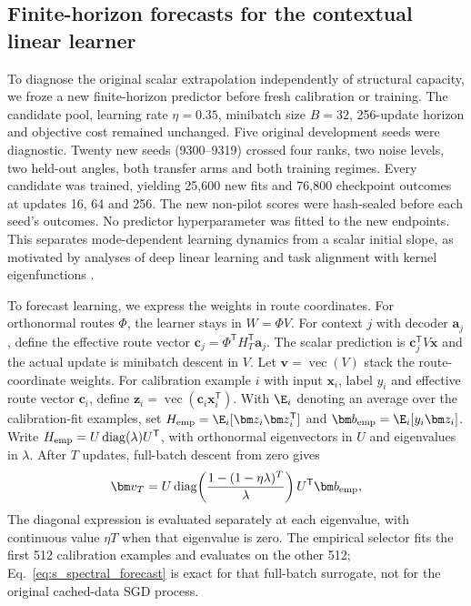 


\subsection{Finite-horizon forecasts for the contextual linear learner}
\label{note:finite_horizon_morphology}

To diagnose the original scalar extrapolation independently of structural
capacity, we froze a new finite-horizon predictor before fresh calibration
or training. The candidate pool, learning rate $\eta=0.35$, minibatch size
$B=32$, 256-update horizon and objective cost remained unchanged. Five
original development seeds were diagnostic. Twenty new seeds (9300--9319)
crossed four ranks, two noise levels, two held-out angles, both transfer arms
and both training regimes. Every candidate was trained, yielding 25,600 new
fits and 76,800 checkpoint outcomes at updates 16, 64 and 256. The new
non-pilot scores were hash-sealed before each seed's outcomes. No predictor
hyperparameter was fitted to the new endpoints.
This separates mode-dependent learning dynamics from a scalar initial slope,
as motivated by analyses of deep linear learning and task alignment with
kernel eigenfunctions \citep{lampinen2019generalization,canatar2021spectral}.

To forecast learning, we express the weights in route coordinates. For
orthonormal routes $\Phi$, the learner stays in $W=\Phi V$. For context
$j$ with decoder $\bm a_j$, define the effective route vector
$\bm c_j=\Phi^{\mathsf T}H_T^{\mathsf T}\bm a_j$.
The scalar prediction is $\bm c_j^{\mathsf T}V\bm x$ and the actual update
is minibatch descent in $V$. Let $\bm v=\operatorname{vec}(V)$ stack the route-coordinate weights.
For calibration example $i$ with input $\bm x_i$, label $y_i$ and effective
route vector $\bm c_i$, define
$\bm z_i=\operatorname{vec}(\bm c_i\bm x_i^{\mathsf T})$. With
$\E_i$ denoting an average over the calibration-fit examples, set
$H_{\rm emp}=\E_i[\bm z_i\bm z_i^{\mathsf T}]$ and
$\bm b_{\rm emp}=\E_i[y_i\bm z_i]$. Write
$H_{\rm emp}=U\operatorname{diag}(\lambda)U^{\mathsf T}$, with orthonormal
eigenvectors in $U$ and eigenvalues in $\lambda$. After $T$ updates,
full-batch descent from zero gives
\begin{equation}
 \bm v_T=U\operatorname{diag}\!\left(
 \frac{1-(1-\eta\lambda)^T}{\lambda}\right)U^{\mathsf T}\bm b_{\rm emp},
 \label{eq:s_spectral_forecast}
\end{equation}
The diagonal expression is evaluated separately at each eigenvalue, with
continuous value $\eta T$ when that eigenvalue is zero. The empirical selector
fits the first 512 calibration examples and evaluates on the other 512;
Eq.~\ref{eq:s_spectral_forecast} is exact for that full-batch surrogate,
not for the original cached-data SGD process.

